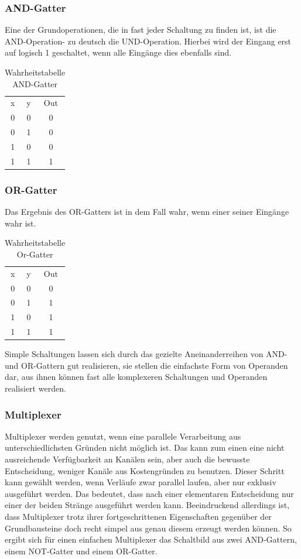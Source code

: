 \documentclass[conference]{IEEEtran}
\begin{document}
\subsubsection{AND-Gatter}
Eine der Grundoperationen, die in fast jeder Schaltung zu finden ist, ist die AND-Operation- zu deutsch die UND-Operation. Hierbei wird der Eingang erst auf logisch 1 geschaltet, wenn alle Eingänge dies ebenfalls sind.\\
\begin{table}[h]
\caption{Wahrheitstabelle AND-Gatter}
\label{tab.1}
\begin{center}
\begin{tabular}[h]{ccc}
x&y&Out\\
0&0&0\\
0&1&0\\
1&0&0\\
1&1&1\\
\end{tabular}
\end{center}
\end{table}
\subsubsection{OR-Gatter}
Das Ergebnis des OR-Gatters ist in dem Fall wahr, wenn einer seiner Eingänge wahr ist.\\
\begin{table}[h]
\caption{Wahrheitstabelle Or-Gatter}
\label{tab.2}
\begin{center}
\begin{tabular}[h]{ccc}
x&y&Out\\
0&0&0\\
0&1&1\\
1&0&1\\
1&1&1\\
\end{tabular}
\end{center}
\end{table}
Simple Schaltungen lassen sich durch das gezielte Aneinanderreihen von AND- und OR-Gattern gut realisieren, sie stellen die
einfachste Form von Operanden dar, aus ihnen können fast alle
komplexeren Schaltungen und Operanden realisiert werden.
\subsubsection{Multiplexer}
Multiplexer werden genutzt, wenn eine parallele Verarbeitung aus unterschiedlichsten Gründen nicht möglich ist. Das kann zum einen eine nicht ausreichende Verfügbarkeit an Kanälen sein, aber auch die bewusste Entscheidung, weniger Kanäle aus Kostengründen zu benutzen. Dieser Schritt kann gewählt werden, wenn Verläufe zwar parallel laufen, aber nur exklusiv ausgeführt werden. Das bedeutet, dass nach einer elementaren Entscheidung nur einer der beiden Stränge ausgeführt werden kann. Beeindruckend allerdings ist, dass Multiplexer trotz ihrer fortgeschrittenen Eigenschaften gegenüber der Grundbausteine doch recht simpel aus genau diesem erzeugt werden können. So ergibt sich für einen einfachen Multiplexer das Schaltbild aus zwei AND-Gattern, einem NOT-Gatter und einem OR-Gatter.
\end{document}
